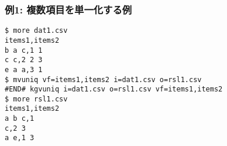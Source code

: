 \subsubsection*{例1: 複数項目を単一化する例}



\begin{Verbatim}[baselinestretch=0.7,frame=single]
$ more dat1.csv
items1,items2
b a c,1 1
c c,2 2 3
e a a,3 1
$ mvuniq vf=items1,items2 i=dat1.csv o=rsl1.csv
#END# kgvuniq i=dat1.csv o=rsl1.csv vf=items1,items2
$ more rsl1.csv
items1,items2
a b c,1
c,2 3
a e,1 3
\end{Verbatim}
